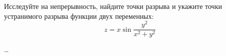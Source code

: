 \begin{problem}
Исследуйте на непрерывность, найдите точки разрыва и укажите точки устранимого разрыва функции двух переменных:
\[ z = x \sin\frac{y^2}{x^2 + y^2} \]
\end{problem}

\begin{solution}
  \dots
\end{solution}